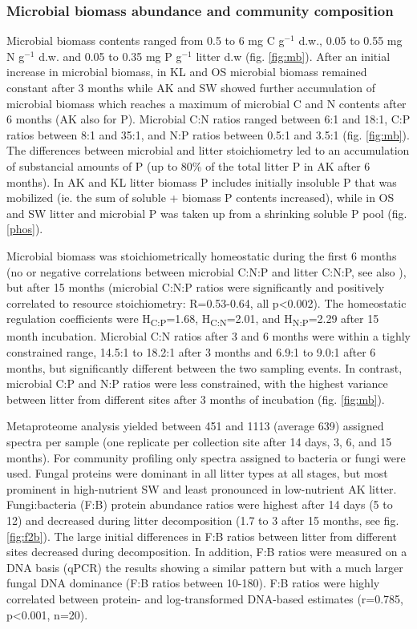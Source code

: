 \subsubsection*{Microbial biomass abundance and community composition}
Microbial biomass contents ranged from 0.5 to 6 mg C g$^{-1}$ d.w., 0.05 to 0.55 mg N g$^{-1}$ d.w. and 0.05 to 0.35 mg P g$^{-1}$ litter d.w (fig. \ref{fig:mb}). After an initial increase in microbial biomass, in KL and OS microbial biomass remained constant after 3 months while AK and SW showed further accumulation of microbial biomass which reaches a maximum of microbial C and N contents after 6 months (AK also for P). Microbial C:N ratios ranged between 6:1 and 18:1, C:P ratios between 8:1 and 35:1, and N:P ratios between 0.5:1 and 3.5:1 (fig. \ref{fig:mb}). The differences between microbial and litter stoichiometry led to an accumulation of substancial amounts of P (up to 80\% of the total litter P in AK after 6 months). In AK and KL litter biomass P includes initially insoluble P that was mobilized (ie. the sum of soluble + biomass P contents increased), while in OS and SW litter  and microbial P was taken up from a shrinking soluble P pool (fig. \ref{phos}).

Microbial biomass was stoichiometrically homeostatic during the first 6 months (no or negative correlations between microbial C:N:P and litter C:N:P, see also \cite{Mooshammer2011}), but after 15 months (microbial C:N:P ratios were significantly and positively correlated to resource stoichiometry: R=0.53-0.64, all p\textless 0.002). The homeostatic regulation coefficients \cite{Sterner2002} were H\textsubscript{C:P}=1.68, H\textsubscript {C:N}=2.01, and H\textsubscript{N:P}=2.29 after 15 month incubation. Microbial C:N ratios after 3 and 6 months were within a tighly constrained range, 14.5:1 to 18.2:1 after 3 months and 6.9:1 to 9.0:1 after 6 months, but significantly different between the two sampling events. In contrast, microbial C:P and N:P ratios were less constrained, with the highest variance between litter from different sites after 3 months of incubation (fig. \ref{fig:mb}).

Metaproteome analysis yielded between 451 and 1113 (average 639) assigned spectra per sample (one replicate per collection site after 14 days, 3, 6, and 15 months). For community profiling only spectra assigned to bacteria or fungi were used. Fungal proteins were dominant in all litter types at all stages, but most prominent in high-nutrient SW and least pronounced in low-nutrient AK litter. Fungi:bacteria (F:B) protein abundance ratios were highest after 14 days (5 to 12) and decreased during litter decomposition (1.7 to 3 after 15 months, see fig. \ref{fig:f2b}). The large initial differences in F:B ratios between litter from different sites decreased during decomposition. In addition, F:B ratios were measured on a DNA basis (qPCR) the results showing a similar pattern but with a much larger fungal DNA dominance (F:B ratios between 10-180). F:B ratios were highly correlated between protein- and log-transformed DNA-based estimates (r=0.785, p\textless 0.001, n=20).

